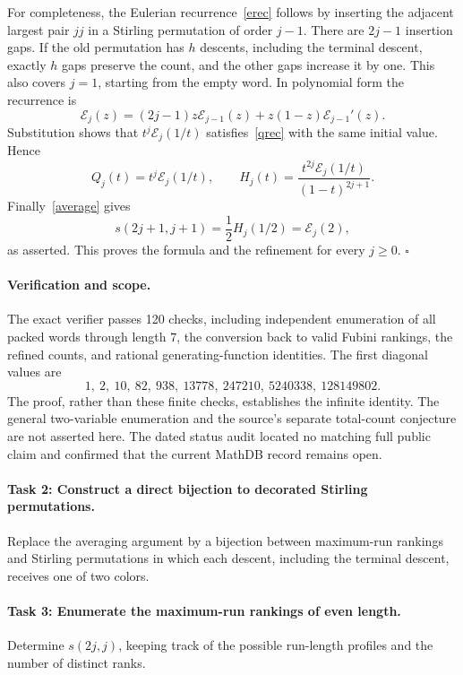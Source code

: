 \documentclass[11pt]{article}
\newcommand{\E}{\mathcal E}
\begin{document}
For completeness, the Eulerian recurrence~\eqref{erec} follows by
inserting the adjacent largest pair \(jj\) in a Stirling permutation
of order \(j-1\). There are \(2j-1\) insertion gaps. If the old
permutation has \(h\) descents, including the terminal descent,
exactly \(h\) gaps preserve the count, and the other gaps increase
it by one. This also covers \(j=1\), starting from the empty word.
In polynomial form the recurrence is
\[
 \E_j(z)=(2j-1)z\E_{j-1}(z)
                         +z(1-z)\E_{j-1}'(z).
\]
Substitution shows that \(t^j\E_j(1/t)\) satisfies~\eqref{qrec}
with the same initial value. Hence
\[
 Q_j(t)=t^j\E_j(1/t),\qquad
 H_j(t)=\frac{t^{2j}\E_j(1/t)}{(1-t)^{2j+1}}.
\]
Finally~\eqref{average} gives
\[
 s(2j+1,j+1)=\frac12H_j(1/2)=\E_j(2),
\]
as asserted. This proves the formula and the refinement for
every \(j\ge0\).
\hfill\(\square\)

\paragraph{Verification and scope.}
The exact verifier passes 120 checks, including independent enumeration
of all packed words through length \(7\), the conversion back to valid
Fubini rankings, the refined counts, and rational generating-function
identities. The first diagonal values are
\[
 1,\ 2,\ 10,\ 82,\ 938,\ 13778,\ 247210,\ 5240338,\ 128149802.
\]
The proof, rather than these finite checks, establishes the infinite
identity. The general two-variable enumeration and the source's
separate total-count conjecture are not asserted here.
The dated status audit located no matching full public claim and
confirmed that the current MathDB record remains open.

\paragraph{Task 2: Construct a direct bijection to decorated Stirling permutations.}
Replace the averaging argument by a bijection between maximum-run
rankings and Stirling permutations in which each descent, including
the terminal descent, receives one of two colors.

\paragraph{Task 3: Enumerate the maximum-run rankings of even length.}
Determine \(s(2j,j)\), keeping track of the possible run-length
profiles and the number of distinct ranks.
\end{document}
